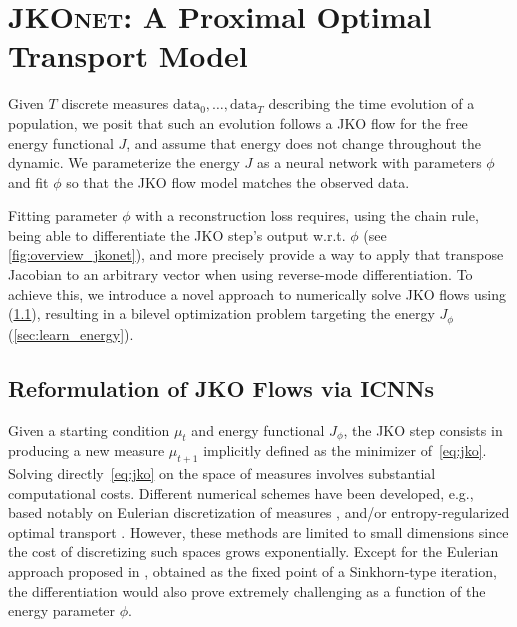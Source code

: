 \section{\textsc{JKOnet}: A Proximal Optimal Transport Model} 

Given $T$ discrete measures $\mathrm{data}_0, \dots, \mathrm{data}_T$ describing the time evolution of a population, we posit that such an evolution follows a \acrshort{JKO} flow for the free energy functional $J$, and assume that energy does not change throughout the dynamic. We parameterize the energy $J$ as a neural network with parameters $\phi$ and fit $\phi$ so that the \acrshort{JKO} flow model matches the observed data. 

Fitting parameter $\phi$ with a reconstruction loss requires, using the chain rule, being able to differentiate the \acrshort{JKO} step's output w.r.t. $\phi$ (see \cref{fig:overview_jkonet}), and more precisely provide a way to apply that transpose Jacobian to an arbitrary vector when using reverse-mode differentiation. To achieve this, we introduce a novel approach to numerically solve \acrshort{JKO} flows using  (\cref{sec:jko_icnn}), resulting in a bilevel optimization problem targeting the energy $J_\phi$ (\cref{sec:learn_energy}).

\subsection{Reformulation of JKO Flows via ICNNs} \label{sec:jko_icnn}
Given a starting condition $\mu_t$ and energy functional $J_\phi$, the \acrshort{JKO} step consists in producing a new measure $\mu_{t+1}$ implicitly defined as the minimizer of~\eqref{eq:jko}. Solving directly~\eqref{eq:jko} on the space of measures involves substantial computational costs. Different numerical schemes have been developed, e.g., based notably on Eulerian discretization of measures \citep{carrillo2021primal, benamou2016discretization}, and/or entropy-regularized optimal transport \citep{peyre2015entropic}. However, these methods are limited to small dimensions since the cost of discretizing such spaces grows exponentially. Except for the Eulerian approach proposed in \citep{peyre2015entropic}, obtained as the fixed point of a Sinkhorn-type iteration, the differentiation would also prove extremely challenging as a function of the energy parameter $\phi$.

